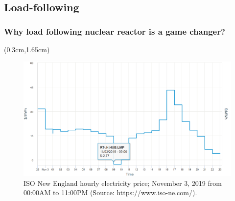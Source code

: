 \subsection{Load-following}
\begin{frame}
\frametitle{Why load following nuclear reactor is a game changer?}
	\begin{textblock*}{12.1cm}(0.3cm,1.65cm) %
\begin{figure}[t]
	\includegraphics[width=\textwidth]{./images/ne_one_day_price.png}
		\vspace{-6mm}
	\caption{ISO New England hourly electricity price; November 3, 2019 
	from 00:00AM to 11:00PM (Source: https://www.iso-ne.com/).}
\end{figure}  
\end{textblock*}
\end{frame}

